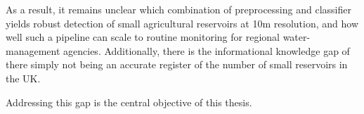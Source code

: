 As a result, it remains unclear which combination of preprocessing and classifier yields robust detection of small agricultural reservoirs at 10m resolution, and how well such a pipeline can scale to routine monitoring for regional water-management agencies. Additionally, there is the informational knowledge gap of there simply not being an accurate register of the number of small reservoirs in the UK. 

Addressing this gap is the central objective of this thesis.